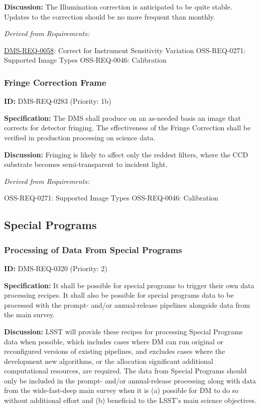 \documentclass[SE,toc,lsstdraft]{lsstdoc}
\begin{document}
\textbf{Discussion:} The Illumination correction is anticipated to be quite stable. Updates to the correction should be no more frequent than monthly.

\emph{Derived from Requirements:}

\hyperref[DMS-REQ-0058]{DMS-REQ-0058}:
Correct for Instrument Sensitivity Variation \newline
OSS-REQ-0271:
Supported Image Types \newline
OSS-REQ-0046:
Calibration \newline

\subsubsection{Fringe Correction Frame}

\label{DMS-REQ-0283}
\textbf{ID:} DMS-REQ-0283 (Priority: 1b)

\textbf{Specification:} The DMS shall produce on an as-needed basis an image that corrects for detector fringing. The effectiveness of the Fringe Correction shall be verified in production processing on science data.

\textbf{Discussion: }Fringing is likely to affect only the reddest filters, where the CCD substrate becomes semi-transparent to incident light.

\emph{Derived from Requirements:}

OSS-REQ-0271:
Supported Image Types \newline
OSS-REQ-0046:
Calibration \newline

\subsection{Special Programs}

\subsubsection{Processing of Data From Special Programs}

\label{DMS-REQ-0320}
\textbf{ID:} DMS-REQ-0320 (Priority: 2)

\textbf{Specification:}
It shall be possible for special programs to trigger their own data processing recipes. It shall also be possible for special programs data to be processed with the prompt- and/or annual-release pipelines alongside data from the main survey.

\textbf{Discussion:}
LSST will provide these recipes for processing Special Programs data when possible, which includes cases where DM can run original or reconfigured versions of existing pipelines, and excludes cases where the development new algorithms, or the allocation significant additional computational resources, are required. The data from Special Programs should only be included in the prompt- and/or annual-release processing along with data from the wide-fast-deep main survey when it is (a) possible for DM to do so without additional effort and (b) beneficial to the LSST's main science objectives.
\end{document}
